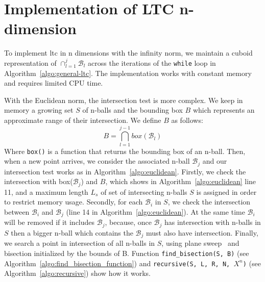 \section{Implementation of LTC n-dimension}
\label{sec:implementation}
To implement \acrshort{ltc} in n dimensions with the infinity norm, we maintain a cuboid
representation of $\cap_{l=1}^j{\mathcal{B}_l}$ across the iterations of the
\texttt{while} loop in Algorithm~\ref{algo:general-ltc}. The implementation
works with constant memory and requires limited CPU time.

With the Euclidean norm, the intersection test is more complex. We keep in
memory a growing set $S$ of n-balls and the bounding box $B$ which represents an
approximate range of their intersection. We define $B$ as follows:
\begin{equation*}
    B = \bigcap_{l=1}^{j-1} box(\mathcal{B}_l) 
\end{equation*}
Where \texttt{box()} is a function that returns the bounding box of an n-ball.
Then, when a new point arrives, we consider the associated n-ball
$\mathcal{B}_j$ and our intersection test works as in
Algorithm~\ref{algo:euclidean}. Firstly, we check the intersection with
box($\mathcal{B}_j$) and $B$, which shows in Algorithm~\ref{algo:euclidean} line
11, and a maximum length $L_s$ of set of intersecting n-balls $S$ is assigned in
order to restrict memory usage. Secondly, for each $\mathcal{B}_i$ in $S$, we
check the intersection between $\mathcal{B}_i$ and $\mathcal{B}_j$ (line 14 in
Algorithm~\ref{algo:euclidean}). At the same time $\mathcal{B}_i$ will be
removed if it includes $\mathcal{B}_j$, because, once $\mathcal{B}_j$ has
intersection with n-balls in $S$ then a bigger n-ball which contains the
$\mathcal{B}_j$ must also have intersection.
Finally, we search a point in intersection of all n-balls in $S$, using plane
sweep~\cite{shamos1976geometric, souvaine2008line} and bisection initialized by
the bounds of B. Function \texttt{find\_bisection(S, B)} (see
Algorithm~\ref{algo:find_bisection_function}) and \texttt{recursive(S, L, R, N,
$X^n$)} (see Algorithm~\ref{algo:recursive}) show how it works. 

